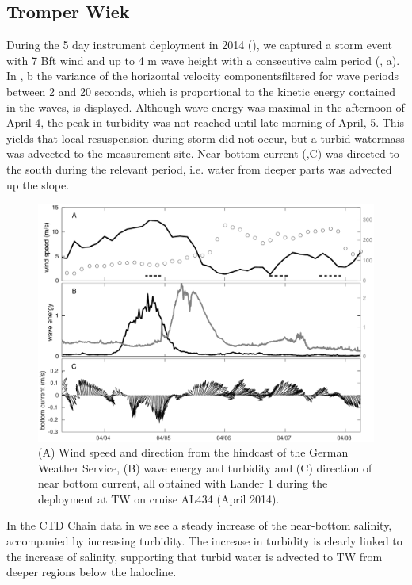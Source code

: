 \subsection{Tromper Wiek}

During the 5 day instrument deployment in 2014 (), we captured 
a storm event with 7 Bft wind and up to 4 m wave height with a consecutive calm 
period (, a). In , b the variance of the 
horizontal velocity componentsfiltered for wave periods between 2 and 20 
seconds, which is proportional to the kinetic energy contained in the 
waves, is displayed. Although wave energy was maximal in the afternoon of April 
4, the peak in turbidity was not reached until late morning of April, 5. This 
yields that local resuspension during storm did not occur, but a turbid 
watermass was advected to the measurement site. Near bottom current 
(,C) was directed to the south during the relevant period, i.e. 
water from deeper parts was advected up the slope.
 \begin{figure}[ht]
\includegraphics[width=15cm]{bilder/al434tw.pdf}
 \caption{(A) Wind speed and direction from the hindcast of the German Weather 
Service, (B) wave energy and turbidity and (C) direction of 
near bottom current, all obtained with Lander 1 during the deployment at TW on 
cruise AL434 (April 2014).}
 \label{tromperwiek}
 \end{figure}

In the CTD Chain data in  we see a steady increase of the 
near-bottom salinity, accompanied by increasing turbidity. The increase in 
turbidity is clearly linked to the increase of salinity, supporting that turbid 
water is advected to TW from deeper regions below the halocline.

